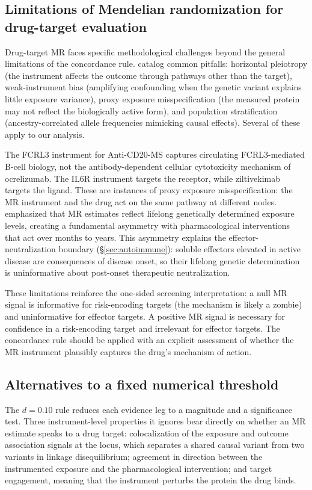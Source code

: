 \documentclass[11pt]{article}
\begin{document}
\subsection{Limitations of Mendelian randomization for drug-target evaluation}

Drug-target MR faces specific methodological challenges beyond the general limitations of the concordance rule. \citet{gill2024pitfalls} catalog common pitfalls: horizontal pleiotropy (the instrument affects the outcome through pathways other than the target), weak-instrument bias (amplifying confounding when the genetic variant explains little exposure variance), proxy exposure misspecification (the measured protein may not reflect the biologically active form), and population stratification (ancestry-correlated allele frequencies mimicking causal effects). Several of these apply to our analysis.

The FCRL3 instrument for Anti-CD20-MS captures circulating FCRL3-mediated B-cell biology, not the antibody-dependent cellular cytotoxicity mechanism of ocrelizumab. The IL6R instrument targets the receptor, while ziltivekimab targets the ligand. These are instances of proxy exposure misspecification: the MR instrument and the drug act on the same pathway at different nodes. \citet{daveysmith2014} emphasized that MR estimates reflect lifelong genetically determined exposure levels, creating a fundamental asymmetry with pharmacological interventions that act over months to years. This asymmetry explains the effector-neutralization boundary (\S\ref{sec:autoimmune}): soluble effectors elevated in active disease are consequences of disease onset, so their lifelong genetic determination is uninformative about post-onset therapeutic neutralization.

These limitations reinforce the one-sided screening interpretation: a null MR signal is informative for risk-encoding targets (the mechanism is likely a zombie) and uninformative for effector targets. A positive MR signal is necessary for confidence in a risk-encoding target and irrelevant for effector targets. The concordance rule should be applied with an explicit assessment of whether the MR instrument plausibly captures the drug's mechanism of action.

\subsection{Alternatives to a fixed numerical threshold}

The $d = 0.10$ rule reduces each evidence leg to a magnitude and a significance test. Three instrument-level properties it ignores bear directly on whether an MR estimate speaks to a drug target: colocalization of the exposure and outcome association signals at the locus, which separates a shared causal variant from two variants in linkage disequilibrium; agreement in direction between the instrumented exposure and the pharmacological intervention; and target engagement, meaning that the instrument perturbs the protein the drug binds.
\end{document}
